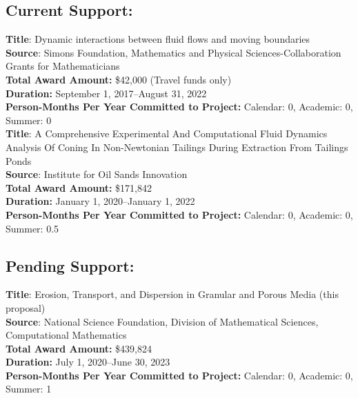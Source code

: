 \documentclass[11pt]{article}
\begin{document}
\subsection*{Current Support:}

{\bf Title}: Dynamic interactions between fluid flows and moving boundaries \\
{\bf Source}: Simons Foundation, Mathematics and Physical
Sciences-Collaboration Grants for Mathematicians \\
{\bf Total Award Amount:} \$42,000 (Travel funds only) \\
{\bf Duration:} September 1, 2017--August 31, 2022 \\
{\bf Person-Months Per Year Committed to Project:} Calendar: 0,
Academic: 0, Summer: 0 \\

\noindent
{\bf Title}:  A Comprehensive Experimental And Computational Fluid Dynamics Analysis Of Coning In Non-Newtonian Tailings During Extraction From Tailings Ponds \\
{\bf Source}:  Institute for Oil Sands Innovation\\
{\bf Total Award Amount:} \$171,842 \\
{\bf Duration:}  January 1, 2020--January 1, 2022\\
{\bf Person-Months Per Year Committed to Project:} Calendar: 0,
Academic: 0, Summer: 0.5 \\

\subsection*{Pending Support:}
{\bf Title}: Erosion, Transport, and Dispersion in Granular and Porous
Media (this proposal) \\
{\bf Source}: National Science Foundation, Division of Mathematical
Sciences, Computational Mathematics \\
{\bf Total Award Amount:} \$439,824 \\ %
{\bf Duration:} July 1, 2020--June 30, 2023 \\
{\bf Person-Months Per Year Committed to Project:} Calendar: 0,
Academic: 0, Summer: 1 \\
\end{document}
